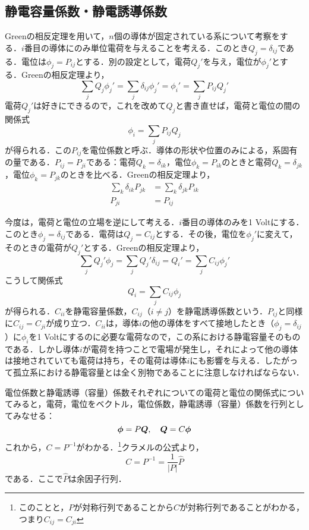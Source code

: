 \documentclass[a4paper,10pt,uplatex]{jsarticle}
\begin{document}
\subsection{静電容量係数・静電誘導係数}
Greenの相反定理を用いて，$n$個の導体が固定されている系について考察をする．$i$番目の導体にのみ単位電荷を与えることを考える．このとき$Q_j = \delta_{ij}$である．電位は$\phi_j = P_{ij}$とする．別の設定として，電荷$Q_j'$を与え，電位が$\phi_j'$とする．Greenの相反定理より，
\begin{equation}
    \sum_j Q_j \phi_j' = \sum_j \delta_{ij} \phi_j' = \phi_i' = \sum_j P_{ij}Q_j'
\end{equation}
電荷$Q_j'$は好きにできるので，これを改めて$Q_j$と書き直せば，電荷と電位の間の関係式
\begin{equation}
    \phi_i = \sum_j P_{ij} Q_j
\end{equation}
が得られる．この$P_{ij}$を電位係数と呼ぶ．導体の形状や位置のみによる，系固有の量である．$P_{ij} = P_{ji}$である：電荷$Q_k = \delta_{ik}$，電位$\phi_k = P_{ik}$のときと電荷$Q_k = \delta_{jk}$，電位$\phi_k = P_{jk}$のときを比べる．Greenの相反定理より，
\begin{align}
    \sum_k \delta_{ik}P_{jk} &= \sum_k \delta_{jk}P_{ik} \\
    P_{ji} &= P_{ij}
\end{align}

今度は，電荷と電位の立場を逆にして考える．$i$番目の導体のみを1 Voltにする．このとき$\phi_j = \delta_{ij}$である．電荷は$Q_j = C_{ij}$とする．その後，電位を$\phi_j'$に変えて，そのときの電荷が$Q_j'$とする．Greenの相反定理より，
\begin{equation}
    \sum_j Q_j' \phi_j = \sum_j Q_j' \delta_{ij} = Q_i' = \sum_j C_{ij}\phi_j'
\end{equation}
こうして関係式
\begin{equation}
    Q_i = \sum_j C_{ij} \phi_j
\end{equation}
が得られる．$C_{ii}$を静電容量係数，$C_{ij}$（$i \neq j$）を静電誘導係数という．$P_{ij}$と同様に$C_{ij} = C_{ji}$が成り立つ．$C_{ii}$は，導体$i$の他の導体をすべて接地したとき（$\phi_j = \delta_{ij}$）に$\phi_i$を1 Voltにするのに必要な電荷なので，この系における静電容量そのものである．しかし導体$i$が電荷を持つことで電場が発生し，それによって他の導体は接地されていても電荷は持ち，その電荷は導体$i$にも影響を与える．したがって孤立系における静電容量とは全く別物であることに注意しなければならない．

電位係数と静電誘導（容量）係数それぞれについての電荷と電位の関係式についてみると，電荷，電位をベクトル，電位係数，静電誘導（容量）係数を行列としてみなせる：
\begin{equation}
    \vb*{\phi} = P\vb*{Q}, \quad \vb*{Q} = C\vb*{\phi}
\end{equation}
これから，$C = P^{-1}$がわかる．\footnote{このことと，$P$が対称行列であることから$C$が対称行列であることがわかる，つまり$C_{ij} = C_{ji}$}クラメルの公式より，
\begin{equation}
    C = P^{-1} = \frac{1}{|P|} \hat{P}
\end{equation}
である．ここで$\hat{P}$は余因子行列．
\end{document}
